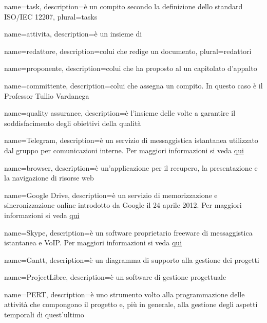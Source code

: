  {
	name=task,
	description={è un compito secondo la definizione dello standard ISO/IEC 12207},
	plural=tasks
}

 {
	name=attivita,
	description={è un insieme di }
}

 {
	name=redattore,
	description={colui che redige un documento},
	plural=redattori
}

 {
	name=proponente,
	description={colui che ha proposto al  un capitolato d'appalto}
}

 {
	name=committente,
	description={colui che assegna un compito. In questo caso è il Professor Tullio Vardanega}
}

 {
	name=quality assurance,
	description={è l'insieme delle  volte a garantire il soddisfacimento degli obiettivi della qualità}
}

 {
	name=Telegram,
	description={è un servizio di messaggistica istantanea utilizzato dal gruppo per comunicazioni interne. Per maggiori informazioni si veda \href{https://it.wikipedia.org/wiki/Telegram_(software)}{qui}}
}

 {
	name=browser,
	description={è un'applicazione per il recupero, la presentazione e la navigazione di risorse web}
}

 {
	name=Google Drive,
	description={è un servizio di memorizzazione e sincronizzazione online introdotto da Google il 24 aprile 2012. Per maggiori informazioni si veda \href{https://it.wikipedia.org/wiki/Google_Drive}{qui}}
}

 {
	name=Skype,
	description={è un software proprietario freeware di messaggistica istantanea e VoIP. Per maggiori informazioni si veda \href{https://it.wikipedia.org/wiki/Skype}{qui}}
}

 {
	name=Gantt,
	description={è un diagramma di supporto alla gestione dei progetti}
}

 {
	name=ProjectLibre,
	description={è un software di gestione progettuale}
}

 {
	name=PERT,
	description={è uno strumento volto alla programmazione delle attività che compongono il progetto e, più in generale, alla gestione degli aspetti temporali di quest'ultimo}
}

